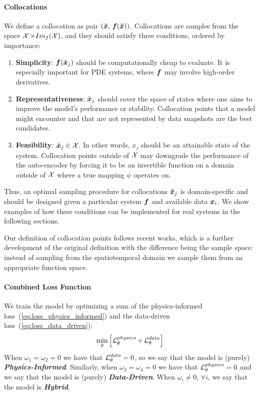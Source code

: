 \paragraph{Collocations}
\label{sec:collocations_conditions} We define a collocation as pair $(\boldsymbol{\bar{x}},\, \boldsymbol{f}(\boldsymbol{\bar{x}}))$. Collocations are samples from the space $\operatorname{\mathcal{X}} \times Im_{f}(\operatorname{\mathcal{X}})$, and they should satisfy three conditions, ordered by importance:
\begin{enumerate}
    \item \textbf{Simplicity}: $\boldsymbol{f}(\bar{\boldsymbol{x}}_j)$ should be computationally cheap to evaluate. It is especially important for PDE systems, where $\boldsymbol{f}$ may involve high-order derivatives.
    \item \textbf{Representativeness}: $\bar{\boldsymbol{x}}_j$ should cover the space of states where one aims to improve the model's performance or stability. Collocation points that a model might encounter and that are not represented by data snapshots are the best candidates.
    \item \textbf{Feasibility}: $\bar{\boldsymbol{x}}_j \in \operatorname{\mathcal{X}}$. In other words, $x_j$ should be an attainable state of the system. Collocation points outside of $\operatorname{\mathcal{X}}$ may downgrade the performance of the auto-encoder by forcing it to be an invertible function on a domain outside of $\operatorname{\mathcal{X}}$ where a true mapping $\psi$ operates on.
\end{enumerate}
Thus, an optimal sampling procedure for collocations $\boldsymbol{\bar{x}}_j$ is domain-specific and should be designed given a particular system $\boldsymbol{f}$ and available data $\boldsymbol{x}_i$. We show examples of how these conditions can be implemented for real systems in the following sections.

Our definition of collocation points follows recent works\cite{liu2022physics}, which is a further development of the original definition \cite{raissi2018hidden} with the difference being the sample space: instead of sampling from the spatiotemporal domain we sample them from an appropriate function space. 

\paragraph{Combined Loss Function} We train the model by optimizing a sum of the physics-informed loss~(\ref{eq:loss_physics_informed}) and the data-driven loss~(\ref{eq:loss_data_driven}):
\begin{equation}
    \label{eq:loss_combined}
    \min_\theta \left[\operatorname{\mathcal{L}}^{physics}_\theta + \operatorname{\mathcal{L}}^{data}_\theta\right]  
\end{equation}
When $\omega_1 = \omega_2 = 0$ we have that $\operatorname{\mathcal{L}}^{data}_\theta = 0$, so we say that the model is (purely) \textit{\textbf{Physics-Informed}}. Similarly, when $\omega_3 = \omega_4 = 0$ we have that $\operatorname{\mathcal{L}}^{physics}_\theta = 0$ and we say that the model is (purely) \textit{\textbf{Data-Driven}}. When $\omega_i \neq 0, \, \forall i$, we say that the model is \textit{\textbf{Hybrid}}.

